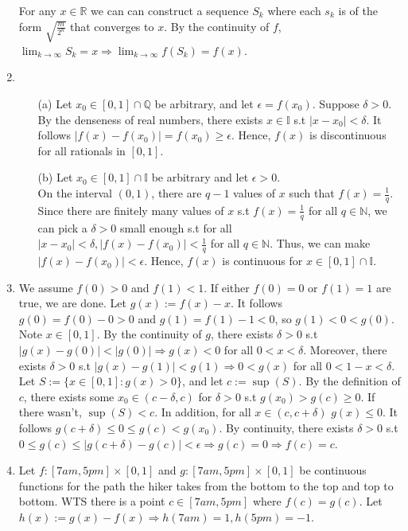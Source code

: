 \documentclass[10pt]{article}
\begin{document}
\begin{enumerate}[label= (Q-\arabic*)]
    For any $x\in\mathbb{R}$ we can can construct a sequence $S_{k}$ where each $s_k$ is of the form $\sqrt{\frac{m}{2^n}}$ that converges to $x$. By the continuity of $f$, $\lim_{k\rightarrow\infty} S_k=x\Rightarrow \lim_{k\rightarrow\infty}f(S_k)=f(x)$.
    \item \begin{itemize}
        \item [(a)] Let $x_0\in[0,1]\cap\mathbb{Q}$ be arbitrary, and let $\epsilon=f(x_0)$. Suppose $\delta>0$. 
        By the denseness of real numbers, there exists $x\in\mathbb{I}$ s.t $|x-x_0|<\delta$. 
        It follows $|f(x)-f(x_0)|=f(x_0)\ge\epsilon$. Hence, $f(x)$ is discontinuous for all rationals in $[0,1]$.\\
        \item [(b)] Let $x_0\in[0,1]\cap\mathbb{I}$ be arbitrary and let $\epsilon>0$.\\ 
        On the interval $(0,1)$, there are $q-1$ values of $x$ such that $f(x)=\frac{1}{q}$.
        Since there are finitely many values of $x$ s.t $f(x)=\frac{1}{q}$ for all $q\in\mathbb{N}$, we can pick a $\delta>0$ small enough s.t for all $|x-x_0|<\delta,|f(x)-f(x_0)|<\frac{1}{q}$ for all $q\in\mathbb{N}$. 
        Thus, we can make $|f(x)-f(x_0)|<\epsilon$.
        Hence, $f(x)$ is continuous for $x\in[0,1]\cap\mathbb{I}$.
    \end{itemize}
    \item We assume $f(0)>0$ and $f(1)<1$. 
    If either $f(0)=0$ or $f(1)=1$ are true, we are done. 
    Let $g(x):=f(x)-x$. 
    It follows $g(0)=f(0)-0>0$ and $g(1)=f(1)-1<0$, so $g(1)<0<g(0)$.
    Note $x\in[0,1]$.
    By the continuity of $g$, there exists $\delta>0$ s.t $|g(x)-g(0)|<|g(0)|\Rightarrow g(x)<0$ for all $0<x<\delta$.
    Moreover, there exists $\delta>0$ s.t $|g(x)-g(1)|<g(1)\Rightarrow 0<g(x)$ for all $0<1-x<\delta$.
    Let $S:=\{x\in[0,1]:g(x)>0\}$, and let $c:=\sup(S)$.
    By the definition of $c$, there exists some $x_0\in(c-\delta,c)$ for $\delta>0$ s.t $g(x_0)>g(c)\ge0$. 
    If there wasn't, $\sup(S)<c$.
    In addition, for all $x\in(c,c+\delta)$ $g(x)\le0$.
    It follows $g(c+\delta)\le0\le g(c)<g(x_0)$.
    By continuity, there exists $\delta>0$ s.t $0\le g(c)\le |g(c+\delta)-g(c)|<\epsilon\Rightarrow g(c)=0\Rightarrow f(c)=c$.
    \item Let $f:[7am,5pm]\times[0,1]$ and $g:[7am,5pm]\times[0,1]$ be continuous functions for the path the hiker takes from the bottom to the top and top to bottom. 
        WTS there is a point $c\in[7am,5pm]$ where $f(c)=g(c)$. Let $h(x):=g(x)-f(x)\Rightarrow h(7am)=1,h(5pm)=-1$. 

\end{enumerate}
\end{document}
